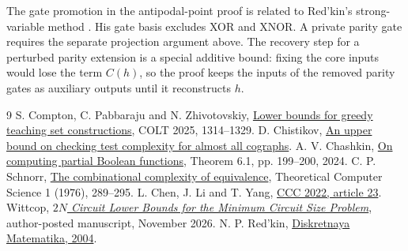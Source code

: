 \documentclass[11pt]{article}
\begin{document}
The gate promotion in the antipodal-point proof is related to Red'kin's strong-variable method \cite{redkin}. His gate basis excludes XOR and XNOR. A private parity gate requires the separate projection argument above. The recovery step for a perturbed parity extension is a special additive bound: fixing the core inputs would lose the term $C(h)$, so the proof keeps the inputs of the removed parity gates as auxiliary outputs until it reconstructs $h$.
\begin{thebibliography}{9}
 S. Compton, C. Pabbaraju and N. Zhivotovskiy, \href{https://proceedings.mlr.press/v291/compton25a.html}{Lower bounds for greedy teaching set constructions}, COLT 2025, 1314--1329.
 D. Chistikov, \href{https://people.mpi-sws.org/~dch/pub/aaco.pdf}{An upper bound on checking test complexity for almost all cographs}.
 A. V. Chashkin, \href{https://keldysh.ru/papers/2024/mvk/mvk2024_152.pdf}{On computing partial Boolean functions}, Theorem 6.1, pp. 199--200, 2024.
 C. P. Schnorr, \href{https://doi.org/10.1016/0304-3975(76)90073-6}{The combinational complexity of equivalence}, Theoretical Computer Science 1 (1976), 289--295.
 L. Chen, J. Li and T. Yang, \href{https://doi.org/10.4230/LIPIcs.CCC.2022.23}{CCC 2022, article 23}.
 Wittcop, \href{https://www.academia.edu/180415409/2N_Circuit_Lower_Bounds_for_the_Minimum_Circuit_Size_Problem}{\emph{$2N$ Circuit Lower Bounds for the Minimum Circuit Size Problem}}, author-posted manuscript, November 2026.
 N. P. Red'kin, \href{https://www.mathnet.ru/links/6ef68b131ca510955e5a8deb4508b795/dm172.pdf}{Diskretnaya Matematika, 2004}.
\end{thebibliography}
\end{document}
